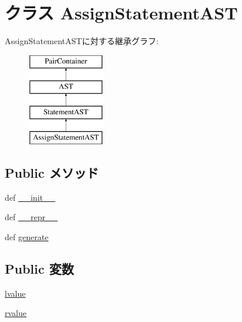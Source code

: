 \hypertarget{classslicc_1_1ast_1_1AssignStatementAST_1_1AssignStatementAST}{
\section{クラス AssignStatementAST}
\label{classslicc_1_1ast_1_1AssignStatementAST_1_1AssignStatementAST}
}
AssignStatementASTに対する継承グラフ:\begin{figure}[H]
\begin{center}
\leavevmode
\includegraphics[height=4cm]{classslicc_1_1ast_1_1AssignStatementAST_1_1AssignStatementAST}
\end{center}
\end{figure}
\subsection*{Public メソッド}
\begin{DoxyCompactItemize}
\item 
def \hyperlink{classslicc_1_1ast_1_1AssignStatementAST_1_1AssignStatementAST_ac775ee34451fdfa742b318538164070e}{\_\-\_\-init\_\-\_\-}
\item 
def \hyperlink{classslicc_1_1ast_1_1AssignStatementAST_1_1AssignStatementAST_ad8b9328939df072e4740cd9a63189744}{\_\-\_\-repr\_\-\_\-}
\item 
def \hyperlink{classslicc_1_1ast_1_1AssignStatementAST_1_1AssignStatementAST_a4555d1cee0dccf3942ea35fe86de2e8e}{generate}
\end{DoxyCompactItemize}
\subsection*{Public 変数}
\begin{DoxyCompactItemize}
\item 
\hyperlink{classslicc_1_1ast_1_1AssignStatementAST_1_1AssignStatementAST_af43d83cd4aeaf409d4cb5cffc2995eda}{lvalue}
\item 
\hyperlink{classslicc_1_1ast_1_1AssignStatementAST_1_1AssignStatementAST_a40a265204241bcb473955e194173909e}{rvalue}
\end{DoxyCompactItemize}


